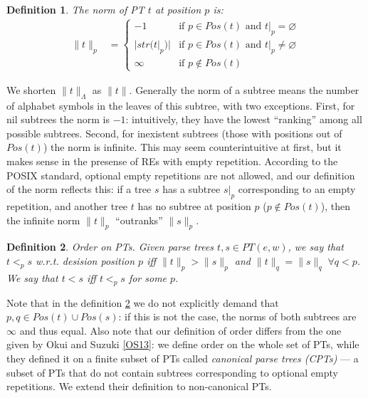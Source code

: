 \documentclass[AMA,STIX1COL]{WileyNJD-v2}
\newtheorem{Xdef}{Definition}
\begin{document}
    \begin{Xdef}\label{norm_of_parse_tree}
    The \emph{norm} of PT $t$ at position $p$ is:
    \begin{align*}
    \|t\|_p &=
        \begin{cases}
            -1          &\text{if } p \in Pos(t) \text{ and } t|_p = \varnothing  \\
            |str(t|_p)| &\text{if } p \in Pos(t) \text{ and } t|_p \neq \varnothing \\
            \infty      &\text{if } p \not\in Pos(t)
        \end{cases}
    \end{align*}
    \end{Xdef}

We shorten $\|t\|_\Lambda$ as $\|t\|$.
Generally the norm of a subtree means the number of alphabet symbols in the leaves of this subtree, with two exceptions.
First, for nil subtrees the norm is $-1$: intuitively, they have the lowest ``ranking'' among all possible subtrees.
Second, for inexistent subtrees (those with positions out of $Pos(t)$) the norm is infinite.
This may seem counterintuitive at first, but it makes sense in the presense of REs with empty repetition.
According to the POSIX standard, optional empty repetitions are not allowed,
and our definition of the norm reflects this:
if a tree $s$ has a subtree $s|_p$ corresponding to an empty repetition,
and another tree $t$ has no subtree at position $p$ ($p \not\in Pos(t)$),
then the infinite norm $\|t\|_p$ ``outranks'' $\|s\|_p$.

    \begin{Xdef}\label{order_on_PTs}
    \emph{Order on PTs.}
    Given parse trees $t, s \in PT(e, w)$, we say that $t <_p s$ w.r.t. \emph{desision position} $p$ %
    iff $\|t\|_p > \|s\|_p$ and $\|t\|_q = \|s\|_q \; \forall q < p$.
    We say that $t < s$ iff $t <_p s$ for some $p$.
    \end{Xdef}

Note that in the definition \ref{order_on_PTs}
we do not explicitly demand that $p, q \in Pos(t) \cup Pos(s)$:
if this is not the case, the norms of both subtrees are $\infty$ and thus equal.
Also note that our definition of order differs from the one given by Okui and Suzuki \ref{OS13}:
we define order on the whole set of PTs,
while they defined it on a finite subset of PTs called \emph{canonical parse trees (CPTs)} ---
a subset of PTs that do not contain subtrees corresponding to optional empty repetitions.
We extend their definition to non-canonical PTs.
\end{document}
